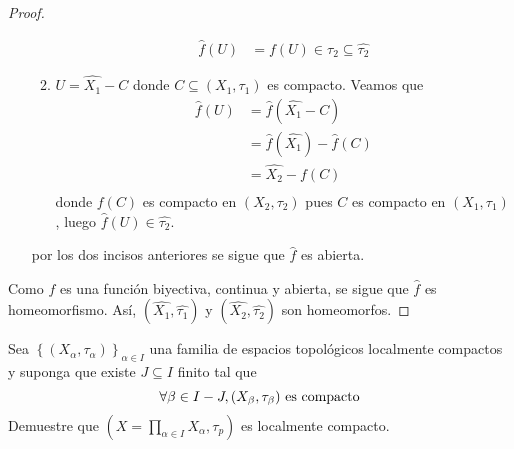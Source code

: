 \documentclass[12pt]{report}
\theoremstyle{largebreak}
\begin{document}
\begin{proof}
\begin{itemize}
\begin{enumerate}
                \begin{equation*}
                    \begin{split}
                        \hat{f}(U)&=f(U)\in\tau_2\subseteq\hat{\tau_2}
                    \end{split}
                \end{equation*}
                \item $U=\hat{X_1}-C$ donde $C\subseteq (X_1,\tau_1)$ es compacto. Veamos que
                \begin{equation*}
                    \begin{split}
                        \hat{f}(U)&=\hat{f}(\hat{X_1}-C)\\
                        &=\hat{f}(\hat{X_1})-\hat{f}(C)\\
                        &=\hat{X_2}-f(C)\\
                    \end{split}
                \end{equation*}
                donde $f(C)$ es compacto en $(X_2,\tau_2)$ pues $C$ es compacto en $(X_1,\tau_1)$, luego $\hat{f}(U)\in\hat{\tau_2}$.
            \end{enumerate}
            por los dos incisos anteriores se sigue que $\hat{f}$ es abierta.
        \end{itemize}
        Como $f$ es una función biyectiva, continua y abierta, se sigue que $\hat{f}$ es homeomorfismo. Así, $(\hat{X_1},\hat{\tau_1})$ y $(\hat{X_2},\hat{\tau_2})$ son homeomorfos.
    \end{proof}

    \begin{excer}
        Sea $\left\{(X_\alpha,\tau_\alpha) \right\}_{\alpha\in I}$ una familia de espacios topológicos localmente compactos y suponga que existe $J\subseteq I$ finito tal que
        \begin{equation*}
            \forall \beta\in I-J, (X_\beta,\tau_\beta)\textup{ es compacto}
        \end{equation*}
        Demuestre que $\left(X=\prod_{\alpha\in I}X_\alpha,\tau_p \right)$ es localmente compacto.
    \end{excer}
\end{document}
